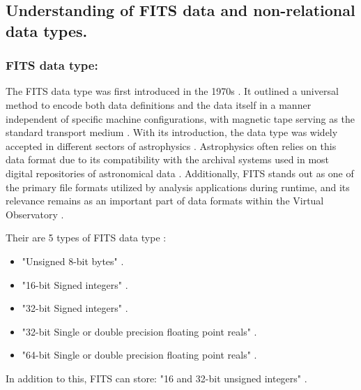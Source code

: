 \documentclass[a4paper,oneside,11pt]{book}
\begin{document}
\subsection{Understanding of FITS data and non-relational data types.}
\subsubsection{FITS data type:}
The FITS data type was first introduced in the 1970s \citep{pence2010definition}. It outlined a universal method to encode both data definitions and the data itself in a manner independent of specific machine configurations, with magnetic tape serving as the standard transport medium \citep{grosbol1991fits}. With its introduction, the data type was widely accepted in different sectors of astrophysics \citep{pence2010definition}. 
Astrophysics often relies on this data format due to its compatibility with the archival systems used in most digital repositories of astronomical data \citep{pence2010definition}. Additionally, FITS stands out as one of the primary file formats utilized by analysis applications during runtime, and its relevance remains as an important part of data formats within the Virtual Observatory \citep{pence2010definition}.

Their are 5 types of FITS data type \citep{nass1999fits}:
\begin{itemize}
    \item "Unsigned 8-bit bytes" \citep{nass1999fits}.
    \item "16-bit Signed integers" \citep{nass1999fits}.
    \item "32-bit Signed integers" \citep{nass1999fits}.
    \item "32-bit Single or double precision floating point reals" \citep{nass1999fits}.
    \item "64-bit Single or double precision floating point reals" \citep{nass1999fits}.
\end{itemize}
In addition to this, FITS can store: "16 and 32-bit unsigned integers" \citep{nass1999fits}.
\end{document}
